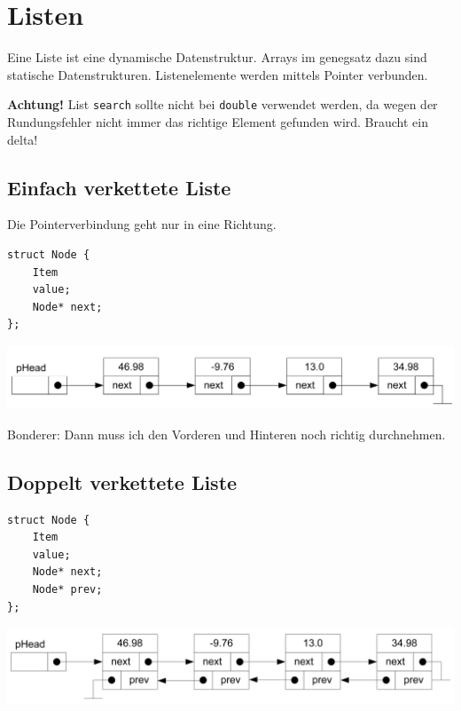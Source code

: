 \section{Listen}

Eine Liste ist eine dynamische Datenstruktur.
Arrays im genegsatz dazu sind statische Datenstrukturen.
Listenelemente werden mittels Pointer verbunden.

\textbf{Achtung!} List \lstinline[style=cppstyle]|search| sollte nicht bei \lstinline[style=cppstyle]|double| verwendet werden, da wegen der Rundungsfehler nicht immer das richtige Element gefunden wird. Braucht ein delta!

\subsection{Einfach verkettete Liste}
Die Pointerverbindung geht nur in eine Richtung.

\begin{lstlisting}[style=cppstyle]
struct Node {
	Item
	value;
	Node* next;
};
\end{lstlisting}

\includegraphics[width=\linewidth]{"Images/single_linked_list.png"}


Bonderer: Dann muss ich den Vorderen und Hinteren noch richtig durchnehmen.

\subsection{Doppelt verkettete Liste}
\begin{lstlisting}[style=cppstyle]
struct Node {
	Item
	value;
	Node* next;
	Node* prev;
};
\end{lstlisting}

\includegraphics[width=\linewidth]{"Images/double_linked_list.png"}